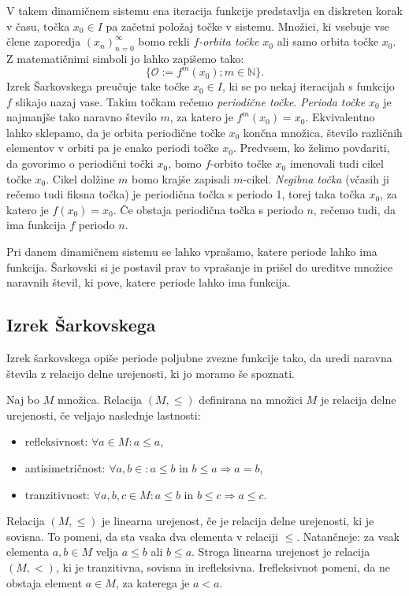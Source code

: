 \documentclass[mat2]{fmfdelo}
\newcommand{\N}{\mathbb N}
\begin{document}
V takem dinamičnem sistemu ena iteracija funkcije predstavlja en diskreten korak v času, točka $x_0 \in I$ pa začetni položaj točke v sistemu. Množici, ki vsebuje vse člene zaporedja $\left( x_n \right)_{n=0}^{\infty}$ bomo rekli \emph{$f$-orbita točke $x_0$} ali samo orbita točke $x_0$. Z matematičnimi simboli jo lahko zapišemo tako:
$$\{ \mathcal{O} := f^m(x_0) ; m \in \N \}.$$
Izrek Šarkovskega preučuje take točke $x_0 \in I$, ki se po nekaj iteracijah s funkcijo $f$ slikajo nazaj vase. Takim točkam rečemo \emph{periodične točke}. \emph{Perioda točke} $x_0$ je najmanjše tako naravno število $m$, za katero je $f^m(x_0) = x_0$. Ekvivalentno lahko sklepamo, da je orbita periodične točke $x_0$ končna množica, število različnih elementov v orbiti pa je enako periodi točke $x_0$. Predvsem, ko želimo povdariti, da govorimo o periodični točki $x_0$, bomo $f$-orbito točke $x_0$ imenovali tudi cikel točke $x_0$. Cikel dolžine $m$ bomo krajše zapisali $m$-cikel. \emph{Negibna točka} (včasih ji rečemo tudi fiksna točka) je periodična točka s periodo 1, torej taka točka $x_0$, za katero je $f(x_0) = x_0$. Če obstaja periodična točka s periodo $n$, rečemo tudi, da ima funkcija $f$ periodo $n$.

Pri danem dinamičnem sistemu se lahko vprašamo, katere periode lahko ima funkcija. Šarkovski si je postavil prav to vprašanje in prišel do ureditve množice naravnih števil, ki pove, katere periode lahko ima funkcija.

\subsection{Izrek Šarkovskega}
Izrek šarkovskega opiše periode poljubne zvezne funkcije tako, da uredi naravna števila z relacijo delne urejenosti, ki jo moramo še spoznati.

\begin{definicija}
Naj bo $M$ množica. Relacija $(M,\leq)$ definirana na množici $M$ je relacija delne urejenosti, če veljajo naslednje lastnosti:
\begin{itemize}
\item refleksivnost: $\forall a \in M : a \leq a$,
\item antisimetričnost:  $\forall a, b \in : a \leq b \text{ in } b \leq a \Rightarrow a = b$,
\item tranzitivnost: $\forall a, b, c \in M : a \leq b \text{ in } b \leq c \Rightarrow a \leq c$.
\end{itemize}
Relacija $(M,\leq)$ je linearna urejenost, če je relacija delne urejenosti, ki je sovisna. To pomeni, da sta vsaka dva elementa v relaciji $\leq$. Natančneje: za vsak elementa $a, b \in M$ velja $a \leq b$ ali $b \leq a$.
Stroga linearna urejenost je relacija $(M, <)$, ki je tranzitivna, sovisna in irefleksivna. Irefleksivnot pomeni, da ne obstaja element $a \in M$, za katerega je $a<a$.
\end{definicija}
\end{document}
